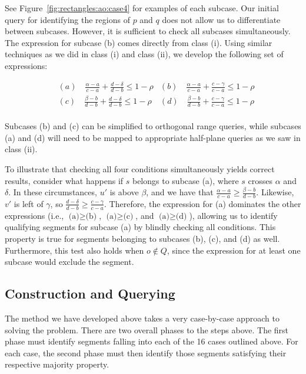 See Figure~\ref{fig:rectangles:ao:case4} for examples of each subcase. Our initial query for identifying the regions of $p$ and $q$ does not allow us to differentiate between subcases. However, it is sufficient to check all subcases simultaneously. The expression for subcase (b) comes directly from class (i).  Using similar techniques as we did in class (i) and class (ii), we develop the following set of expressions:

\begin{align*}
& (a) \quad \frac{\alpha - a}{c - a} + \frac{d - \delta}{d - b} \leq 1 - \rho
& (b) \quad \frac{\alpha - a}{c - a} + \frac{c - \gamma}{c - a} \leq 1 - \rho \\
& (c) \quad \frac{\beta  - b}{d - b} + \frac{d - \delta}{d - b} \leq 1 - \rho  
& (d) \quad \frac{\beta  - b}{d - b} + \frac{c - \gamma}{c - a} \leq 1 - \rho \\
\end{align*}

Subcases (b) and (c) can be simplified to orthogonal range queries, while subcases (a) and (d) will need to be mapped to appropriate half-plane queries as we saw in class (ii).

To illustrate that checking all four conditions simultaneously yields correct results, consider what happens if $s$ belongs to subcase (a), where $s$ crosses $\alpha$ and $\delta$. In these circumstances, $u'$ is above $\beta$, and we have that $\frac{\alpha - a}{c - a} \geq \frac{\beta - b}{d - b}$.  Likewise, $v'$ is left of $\gamma$, so $\frac{d - \delta}{d - b} \geq \frac{c - \gamma}{c - a}$.  Therefore, the expression for (a) dominates the other expressions (i.e., $\text{(a)} \geq \text{(b)}$, $\text{(a)} \geq \text{(c)}$, and $\text{(a)} \geq \text{(d)}$), allowing us to identify qualifying segments for subcase (a) by blindly checking all conditions. This property is true for segments belonging to subcases (b), (c), and (d) as well. Furthermore, this test also holds when $o \not \in Q$, since the expression for at least one subcase would exclude the segment.


\subsection{Construction and Querying}
\label{:rectangles:ao:analysis}

The method we have developed above takes a very case-by-case approach to solving the problem. There are two overall phases to the steps above. The first phase must identify segments falling into each of the 16 cases outlined above. For each case, the second phase must then identify those segments satisfying their respective majority property. 

